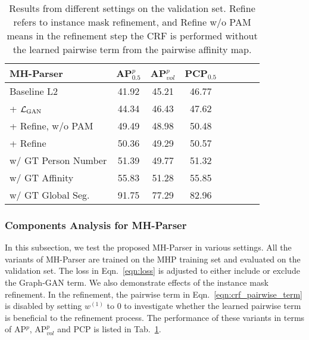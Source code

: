 \documentclass[10pt, letterpaper]{article}
\begin{document}
\begin{table}
  \centering
    \caption{Results from different settings on the validation set. Refine refers to instance mask refinement, and Refine w/o PAM means in the refinement step the CRF is performed without the learned pairwise term from the pairwise affinity map.} \label{tab:ablation_val}
\vspace{2mm}
  \begin{tabular}{lccccccc}
    \toprule
MH-Parser 	& AP$^p_{0.5}$  &   AP$^p_{vol}$ & PCP$_{0.5}$\\
    \midrule
Baseline L2 & 41.92 & 45.21 & 46.77 \\
\hspace{2mm}+ $\mathcal{L}_{\rm{GAN}}$ & 44.34 & 46.43 & 47.62 \\
\hspace{2mm}+ Refine, w/o PAM &   49.49 & 48.98 & 50.48 \\ 
\hspace{2mm}+ Refine &   50.36 & 49.29 & 50.57 \\ 
\midrule
\hspace{2mm}w/ GT Person Number&     51.39 & 49.77 & 51.32  \\ 
\hspace{2mm}w/ GT Affinity &     55.83 & 51.28 & 55.85  \\ 
\hspace{2mm}w/ GT Global Seg. &      91.75 & 77.29 & 82.96  \\ 
    \bottomrule
  \end{tabular}
\end{table}

\subsubsection{Components Analysis for MH-Parser}

In this subsection, we test the proposed MH-Parser in various settings. All the variants of MH-Parser are trained on the MHP training set and evaluated on the validation set. The loss in Eqn.~\eqref{eqn:loss} is adjusted to either include or exclude the Graph-GAN term. We also demonstrate effects of the instance mask refinement. In the refinement, the pairwise term in Eqn.~\eqref{eqn:crf_pairwise_term} is disabled by setting $w^{(1)}$ to $0$ to investigate whether the learned pairwise term is beneficial to the refinement process. The performance of these variants in terms of AP$^p$, AP$^p_{vol}$ and PCP is listed in Tab.~\ref{tab:ablation_val}. 
\end{document}
